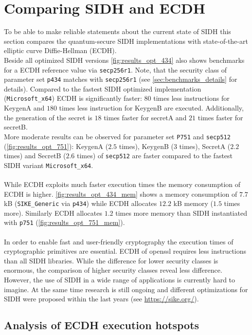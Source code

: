 \section{Comparing SIDH and ECDH} \label{sec:analysis_effiency_ecdh}

To be able to make reliable statements about the current state of SIDH this section compares the quantum-secure SIDH implementations with state-of-the-art elliptic curve Diffie-Hellman (ECDH). \\
Beside all optimized SIDH versions \autoref{fig:results_opt_434} also shows benchmarks for a ECDH reference value via \texttt{secp256r1}. Note, that the security class of parameter set \texttt{p434} matches with \texttt{secp256r1} (see \autoref{sec:benchmarks_details} for details). Compared to the fastest SIDH optimized implementation (\texttt{Microsoft\_x64}) ECDH is significantly faster: $80$ times less instructions for KeygenA and $180$ times less instruction for KeygenB are executed. Additionally, the generation of the secret is $18$ times faster for secretA and $21$ times faster for secretB.\\
More moderate results can be observed for parameter set \texttt{P751} and \texttt{secp512} (\autoref{fig:results_opt_751}): KeygenA ($2.5$ times),  KeygenB ($3$ times), SecretA ($2.2$ times) and SecretB ($2.6$ times) of \texttt{secp512} are faster compared to the fastest SIDH variant \texttt{Microsoft\_x64}.
\\\\
While ECDH exploits much faster execution times the memory consumption of ECDH is higher.  \autoref{fig:results_opt_434_mem} shows a memory consumption of $7.7$ kB (\texttt{SIKE\_Generic} via \texttt{p434}) while ECDH allocates $12.2$ kB memory ($1.5$ times more). Similarly ECDH allocates $1.2$ times more memory than SIDH instantiated with \texttt{p751} (\autoref{fig:results_opt_751_mem}).
\\\\
In order to enable fast and user-friendly cryptography the execution times of cryptographic primitives are essential. ECDH of openssl requires less instructions than all SIDH libraries. While the difference for lower security classes is enormous, the comparison of higher security classes reveal less difference. However, the use of SIDH in a wide range of applications is currently hard to imagine. At the same time research is still ongoing and different optimizations for SIDH were proposed within the last years (see \url{https://sike.org/}). 
\subsection{Analysis of ECDH execution hotspots}

